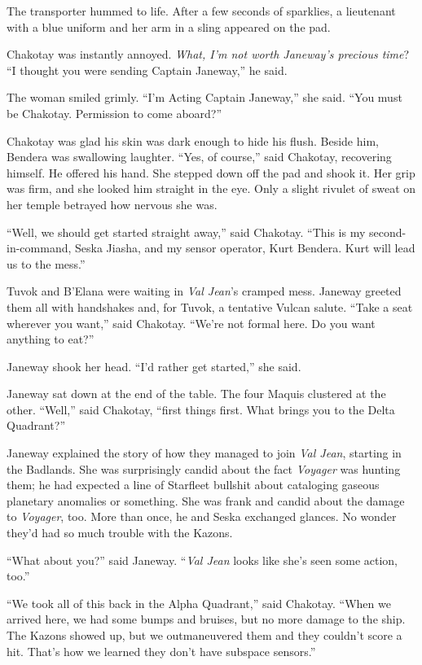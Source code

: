 \documentclass[twoside,letterpaper,12pt]{memoir}
\begin{document}
The transporter hummed to life. After a few seconds of sparklies, a lieutenant with a blue uniform and her arm in a sling appeared on the pad.

Chakotay was instantly annoyed. \textit{What, I'm not worth Janeway's precious time}? ``I thought you were sending Captain Janeway,'' he said.

The woman smiled grimly. ``I'm Acting Captain Janeway,'' she said. ``You must be Chakotay. Permission to come aboard?''

Chakotay was glad his skin was dark enough to hide his flush. Beside him, Bendera was swallowing laughter. ``Yes, of course,'' said Chakotay, recovering himself. He offered his hand. She stepped down off the pad and shook it. Her grip was firm, and she looked him straight in the eye. Only a slight rivulet of sweat on her temple betrayed how nervous she was.

``Well, we should get started straight away,'' said Chakotay. ``This is my second-in-command, Seska Jiasha, and my sensor operator, Kurt Bendera. Kurt will lead us to the mess.''

Tuvok and B'Elana were waiting in \textit{Val Jean}'s cramped mess. Janeway greeted them all with handshakes and, for Tuvok, a tentative Vulcan salute. ``Take a seat wherever you want,'' said Chakotay. ``We're not formal here. Do you want anything to eat?''

Janeway shook her head. ``I'd rather get started,'' she said.

Janeway sat down at the end of the table. The four Maquis clustered at the other. ``Well,'' said Chakotay, ``first things first. What brings you to the Delta Quadrant?''

Janeway explained the story of how they managed to join \textit{Val Jean}, starting in the Badlands. She was surprisingly candid about the fact \textit{Voyager} was hunting them; he had expected a line of Starfleet bullshit about cataloging gaseous planetary anomalies or something. She was frank and candid about the damage to \textit{Voyager}, too. More than once, he and Seska exchanged glances. No wonder they'd had so much trouble with the Kazons.

``What about you?'' said Janeway. ``\textit{Val Jean} looks like she's seen some action, too.''

``We took all of this back in the Alpha Quadrant,'' said Chakotay. ``When we arrived here, we had some bumps and bruises, but no more damage to the ship. The Kazons showed up, but we outmaneuvered them and they couldn't score a hit. That's how we learned they don't have subspace sensors.''
\end{document}

